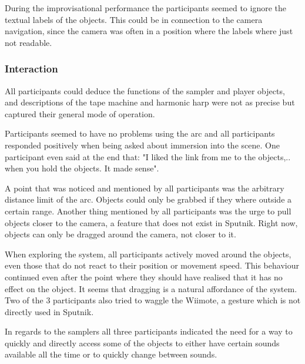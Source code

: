 \documentclass[10pt,a4paper]{scrartcl}
\begin{document}
During the improvisational performance the participants seemed to ignore the textual labels of the objects. This could be in connection to the camera navigation, since the camera was often in a position where the labels where just not readable.



\subsubsection{Interaction}
All participants could deduce the functions of the sampler and player objects, and descriptions of the tape machine and harmonic harp were not as precise but captured their general mode of operation. 

Participants seemed to have no problems using the arc and all participants responded positively when being asked about immersion into the scene. One participant even said at the end that: "I liked the link from me to the objects,.. when you hold the objects. It made sense".

A point that was noticed and mentioned by all participants was the arbitrary distance limit of the arc. Objects could only be grabbed if they where outside a certain range. Another thing mentioned by all participants was the urge to pull objects closer to the camera, a feature that does not exist in Sputnik. Right now, objects can only be dragged around the camera, not closer to it.

When exploring the system, all participants actively moved around the objects, even those that do not react to their position or movement speed. This behaviour continued even after the point where they should have realised that it has no effect on the object. It seems that dragging is a natural affordance of the system. Two of the 3 participants also tried to waggle the Wiimote, a gesture which is not directly used in Sputnik. 
 
In regards to the samplers all three participants indicated the need for a way to quickly and directly access some of the objects to either have certain sounds available all the time or to quickly change between sounds.
\end{document}
